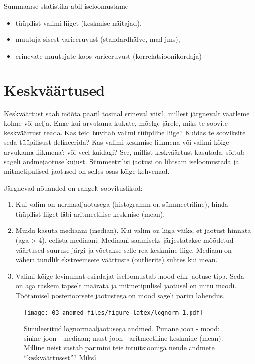 \documentclass[]{book}
\providecommand{\tightlist}{%
  \setlength{\itemsep}{0pt}\setlength{\parskip}{0pt}}
\begin{document}
Summaarse statistika abil iseloomustame

\begin{itemize}
\tightlist
\item
  tüüpilist valimi liiget (keskmise näitajad),
\item
  muutuja sisest varieeruvust (standardhälve, mad jms),
\item
  erinevate muutujate koos-varieeruvust (korrelatsioonikordaja)
\end{itemize}

\hypertarget{keskvaartused}{%
\section*{Keskväärtused}\label{keskvaartused}}

Keskväärtust saab mõõta paaril tosinal erineval viisil, millest järgnevalt vaatleme kolme või nelja. Enne kui arvutama kukute, mõelge järele, miks te soovite keskväärtust teada. Kas teid huvitab valimi tüüpiline liige? Kuidas te sooviksite seda tüüpilisust defineerida? Kas valimi keskmise liikmena või valimi kõige arvukama liikmena? või veel kuidagi?
See, millist keskväärtust kasutada, sõltub sageli andmejaotuse kujust. Sümmeetrilisi jaotusi on lihtsam iseloomustada ja mitmetipulised jaotused on selles osas kõige kehvemad.

Järgnevad nõuanded on rangelt soovituslikud:

\begin{enumerate}
\def\labelenumi{(\arabic{enumi})}
\item
  Kui valim on normaaljaotusega (histogramm on sümmeetriline), hinda tüüpilist liiget läbi aritmeetilise keskmise (mean).
\item
  Muidu kasuta mediaani (median). Kui valim on liiga väike, et jaotust hinnata (aga \textgreater{} 4), eelista mediaani. Mediaani saamiseks järjestatakse mõõdetud väärtused suuruse järgi ja võetakse selle rea keskmine liige. Mediaan on vähem tundlik ekstreemsete väärtuste (outlierite) suhtes kui mean.
\item
  Valimi kõige levinumat esindajat iseloomustab mood ehk jaotuse tipp. Seda on aga raskem täpselt määrata ja mitmetipulisel jaotusel on mitu moodi. Töötamisel posterioorsete jaotustega on mood sageli parim lahendus.
\end{enumerate}



\begin{figure}
\centering
\texttt{[image: 03\_andmed\_files/figure-latex/lognorm-1.pdf]}
\caption{\label{fig:lognorm}Simuleeritud lognormaaljaotusega andmed. Punane joon - mood; sinine joon - mediaan; must joon - aritmeetiline keskmine (mean). Milline neist vastab parimini teie intuitsiooniga nende andmete ``keskväärtusest''? Miks?}
\end{figure}
\end{document}
